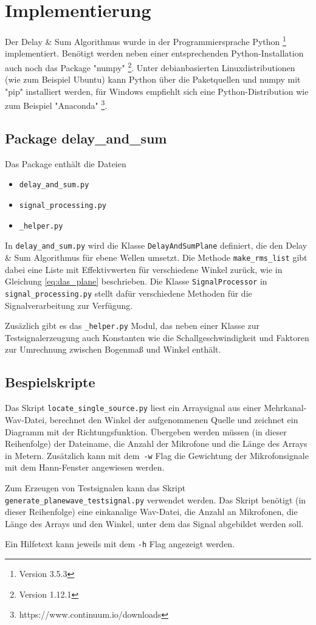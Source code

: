 \section{Implementierung}
	
	Der Delay \& Sum Algorithmus wurde in der Programmiersprache Python \footnote{Version 3.5.3} implementiert. Benötigt werden neben einer entsprechenden Python-Installation auch noch das Package "numpy" \footnote{Version 1.12.1}. Unter debianbasierten Linuxdistributionen (wie zum Beispiel Ubuntu) kann Python über die Paketquellen und numpy mit "pip" installiert werden, für Windows empfiehlt sich eine Python-Distribution wie zum Beispiel "Anaconda" \footnote{https://www.continuum.io/downloads}.
	
	\subsection{Package delay\_and\_sum}
	
	Das Package enthält die Dateien
	\begin{itemize}
		\item \texttt{delay\_and\_sum.py}
		\item \texttt{signal\_processing.py}
		\item \texttt{\_helper.py}
	\end{itemize}
	In \texttt{delay\_and\_sum.py} wird die Klasse \texttt{DelayAndSumPlane} definiert, die den Delay \& Sum Algorithmus für ebene Wellen umsetzt. Die Methode \texttt{make\_rms\_list} gibt dabei eine Liste mit Effektivwerten für verschiedene Winkel zurück, wie in Gleichung \ref{eq:das_plane} beschrieben.
	Die Klasse \texttt{SignalProcessor} in \texttt{signal\_processing.py} stellt dafür verschiedene Methoden für die Signalverarbeitung zur Verfügung.
	
	Zusäzlich gibt es das \texttt{\_helper.py} Modul, das neben einer Klasse zur Testsignalerzeugung auch Konstanten wie die Schallgeschwindigkeit und Faktoren zur Umrechnung zwischen Bogenmaß und Winkel enthält.
	
\subsection{Bespielskripte}

	Das Skript \texttt{locate\_single\_source.py} liest ein Arraysignal aus einer Mehrkanal-Wav-Datei, berechnet den Winkel der aufgenommenen Quelle und zeichnet ein Diagramm mit der Richtungsfunktion.
	Übergeben werden müssen (in dieser Reihenfolge) der Dateiname, die Anzahl der Mikrofone und die Länge des Arrays in Metern. Zusätzlich kann mit dem~\texttt{-w} Flag die Gewichtung der Mikrofonsignale mit dem Hann-Fenster angewiesen werden.
	
	Zum Erzeugen von Testsignalen kann das Skript \texttt{generate\_planewave\_testsignal.py} verwendet werden. Das Skript benötigt (in dieser Reihenfolge) eine einkanalige Wav-Datei, die Anzahl an Mikrofonen, die Länge des Arrays und den Winkel, unter dem das Signal abgebildet werden soll.
	
	Ein Hilfetext kann jeweils mit dem \texttt{-h} Flag angezeigt werden.